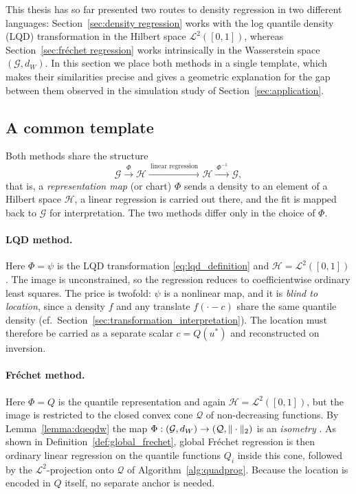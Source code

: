 \begin{postsub}
This thesis has so far presented two routes to density regression in two different
languages: Section~\ref{sec:density regression} works with the log quantile density (LQD)
transformation in the Hilbert space $\mathcal{L}^2([0,1])$, whereas
Section~\ref{sec:fréchet regression} works intrinsically in the Wasserstein space
$(\mathcal{G}, d_W)$. In this section we place both methods in a single template, which
makes their similarities precise and gives a geometric explanation for the gap between
them observed in the simulation study of Section~\ref{sec:application}.

\subsection{A common template}
\label{sec:common_template}
Both methods share the structure
\begin{equation}
    \label{eq:transformation_template}
    \mathcal{G} \xrightarrow{\ \Phi\ } \mathcal{H}
    \xrightarrow{\ \text{linear regression}\ } \mathcal{H}
    \xrightarrow{\ \Phi^{-1}\ } \mathcal{G},
\end{equation}
that is, a \emph{representation map} (or chart) $\Phi$ sends a density to an element of a
Hilbert space $\mathcal{H}$, a linear regression is carried out there, and the fit is
mapped back to $\mathcal{G}$ for interpretation. The two methods differ only in the choice
of $\Phi$.

\paragraph{LQD method.} Here $\Phi = \psi$ is the LQD transformation
\eqref{eq:lqd_definition} and $\mathcal{H} = \mathcal{L}^2([0,1])$. The image is
unconstrained, so the regression reduces to coefficientwise ordinary least squares. The
price is twofold: $\psi$ is a nonlinear map, and it is \emph{blind to location}, since a
density $f$ and any translate $f(\cdot - c)$ share the same quantile density
(cf.\ Section~\ref{sec:transformation_interpretation}). The location must therefore be
carried as a separate scalar $c = Q(u^*)$ and reconstructed on inversion.

\paragraph{Fréchet method.} Here $\Phi = Q$ is the quantile representation and again
$\mathcal{H} = \mathcal{L}^2([0,1])$, but the image is restricted to the closed convex
cone $\mathcal{Q}$ of non-decreasing functions. By Lemma~\ref{lemma:dqeqdw} the map
$\Phi : (\mathcal{G}, d_W) \to (\mathcal{Q}, \|\cdot\|_2)$ is an \emph{isometry}
\parencite[cf.][Chapter~2]{PanaretosZemel2020}. As shown in
Definition~\ref{def:global_frechet}, global Fréchet regression is then ordinary linear
regression on the quantile functions $Q_i$ inside this cone, followed by the
$\mathcal{L}^2$-projection onto $\mathcal{Q}$ of Algorithm~\ref{alg:quadprog}. Because the
location is encoded in $Q$ itself, no separate anchor is needed.


\end{postsub}
